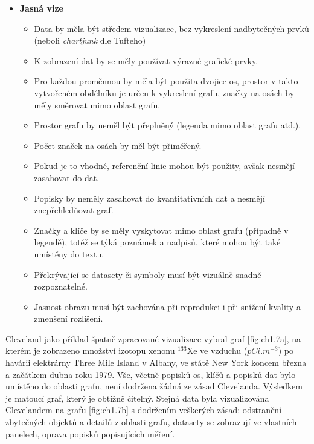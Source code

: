 \documentclass[12pt,]{article}
\providecommand{\tightlist}{%
  \setlength{\itemsep}{0pt}\setlength{\parskip}{0pt}}
\begin{document}
\begin{itemize}
\tightlist
\item
  \textbf{Jasná vize}

  \begin{itemize}
  \tightlist
  \item
    Data by měla být středem vizualizace, bez vykreslení nadbytečných
    prvků (neboli \emph{chartjunk} dle Tufteho)
  \item
    K zobrazení dat by se měly používat výrazné grafické prvky.
  \item
    Pro každou proměnnou by měla být použita dvojice os, prostor v takto
    vytvořeném obdélníku je určen k vykreslení grafu, značky na osách by
    měly směrovat mimo oblast grafu.
  \item
    Prostor grafu by neměl být přeplněný (legenda mimo oblast grafu
    atd.).
  \item
    Počet značek na osách by měl být přiměřený.
  \item
    Pokud je to vhodné, referenční linie mohou být použity, avšak
    nesmějí zasahovat do dat.
  \item
    Popisky by neměly zasahovat do kvantitativních dat a nesmějí
    znepřehledňovat graf.
  \item
    Značky a klíče by se měly vyskytovat mimo oblast grafu (případně v
    legendě), totéž se týká poznámek a nadpisů, které mohou být také
    umístěny do textu.
  \item
    Překrývající se datasety či symboly musí být vizuálně snadně
    rozpoznatelné.
  \item
    Jasnost obrazu musí být zachována při reprodukci i při snížení
    kvality a zmenšení rozlišení.
  \end{itemize}
\end{itemize}

Cleveland jako příklad špatně zpracované vizualizace vybral graf
\ref{fig:ch1.7a}, na kterém je zobrazeno množství izotopu xenonu
\({}^{133}\mbox{Xe}\) ve vzduchu (\(pCi.m^{-3}\)) po havárii elektrárny
Three Mile Island v Albany, ve státě New York koncem března a začátkem
dubna roku 1979. Vše, včetně popisků os, klíčů a popisků dat bylo
umístěno do oblasti grafu, není dodržena žádná ze zásad Clevelanda.
Výsledkem je matoucí graf, který je obtížně čitelný. Stejná data byla
vizualizována Clevelandem na grafu \ref{fig:ch1.7b} s dodržením
veškerých zásad: odstranění zbytečných objektů a detailů z oblasti
grafu, datasety se zobrazují ve vlastních panelech, oprava popisků
popisujících měření.
\end{document}
